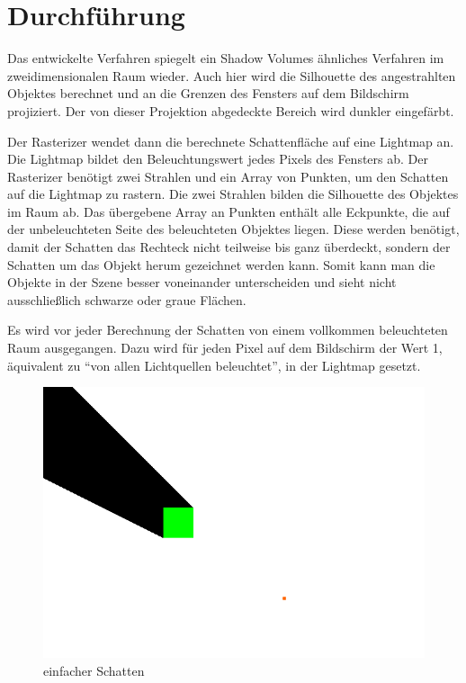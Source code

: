 \section{Durchführung}

Das entwickelte Verfahren spiegelt ein Shadow Volumes ähnliches Verfahren im zweidimensionalen
Raum wieder. Auch hier wird die Silhouette des angestrahlten Objektes berechnet und an die
Grenzen des Fensters auf dem Bildschirm projiziert. Der von dieser Projektion abgedeckte
Bereich wird dunkler eingefärbt.

Der Rasterizer wendet dann die berechnete Schattenfläche auf eine Lightmap an. Die Lightmap bildet den Beleuchtungswert jedes Pixels des Fensters ab. Der Rasterizer benötigt zwei Strahlen und ein Array von Punkten, um den Schatten auf die Lightmap zu rastern. Die zwei Strahlen bilden die Silhouette des Objektes im Raum ab. Das übergebene Array an Punkten enthält alle Eckpunkte, die auf der unbeleuchteten Seite des beleuchteten Objektes liegen. Diese werden benötigt, damit der Schatten das Rechteck nicht teilweise bis ganz überdeckt, sondern der Schatten um das Objekt herum gezeichnet werden kann. Somit kann man die Objekte in der Szene besser voneinander unterscheiden und sieht nicht ausschließlich schwarze oder graue Flächen.

Es wird vor jeder Berechnung der Schatten von einem vollkommen beleuchteten Raum ausgegangen.
Dazu wird für jeden Pixel auf dem Bildschirm der Wert 1, äquivalent zu ``von allen Lichtquellen beleuchtet'', in der Lightmap gesetzt.

\begin{figure}[t]
	\centering
	\includegraphics[width=\columnwidth]{images/durchfuehrung.png}
	\caption{einfacher Schatten}
	\label{fig:durch1}
\end{figure}

